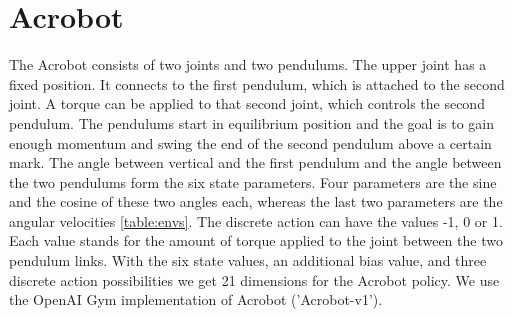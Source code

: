 
\section{Acrobot}



The Acrobot consists of two joints and two pendulums. The upper joint has a fixed position. It connects to the first pendulum, which is attached to the second joint. A torque can be applied to that second joint, which controls the second pendulum. The pendulums start in equilibrium position and the goal is to gain enough momentum and swing the end of the second pendulum above a certain mark. The angle between vertical and the first pendulum and the angle between the two pendulums form the six state parameters. Four parameters are the sine and the cosine of these two angles each, whereas the last two parameters are the angular velocities \ref{table:envs}. The discrete action can have the values -1, 0 or 1. Each value stands for the amount of torque applied to the joint between the two pendulum links. With the six state values, an additional bias value, and three discrete action possibilities we get 21 dimensions for the Acrobot policy. We use the OpenAI Gym implementation of Acrobot ('Acrobot-v1').

